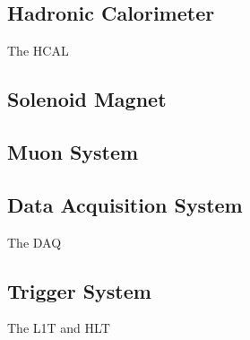 \subsection{Hadronic Calorimeter}
\label{SUBSECTION:ExperimentalApparatus_CMS_HCAL}

The \gls{HCAL}

\subsection{Solenoid Magnet}
\label{SUBSECTION:ExperimentalApparatus_CMS_Magnet}



\subsection{Muon System}
\label{SUBSECTION:ExperimentalApparatus_CMS_Mouns}

\subsection{Data Acquisition System}
\label{SUBSECTION:ExperimentalApparatus_CMS_DAQ}

The \gls{DAQ}

\subsection{Trigger System}
\label{SUBSECTION:ExperimentalApparatus_CMS_Trigger}

The \gls{L1T} and \gls{HLT}

